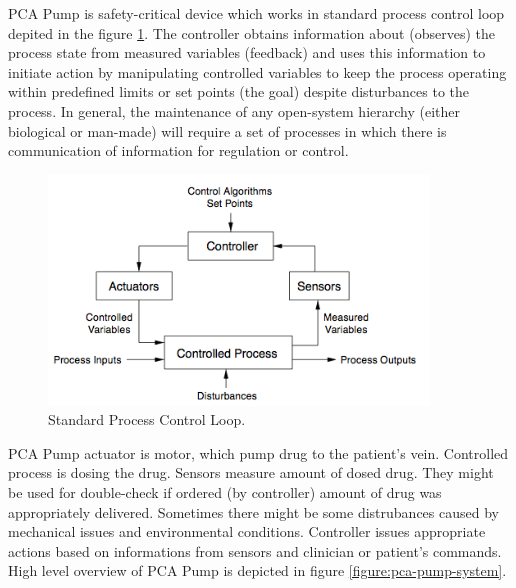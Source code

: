 PCA Pump is safety-critical device which works in standard process control loop depited in the figure \ref{figure:control-loop}. The controller obtains information about (observes) the process state from measured variables (feedback) and uses this information to initiate action by manipulating controlled variables to keep the process operating within predefined limits or set points (the goal) despite disturbances to the process. In general, the maintenance of any open-system hierarchy (either biological or man-made) will require a set of processes in which there is communication of information for regulation or control. \cite{SaferWorld} 

\begin{figure}[ht]%
    \begin{center}
    	\includegraphics[width=0.9\textwidth]{figures/safety-critical-loop.png}    	
    \end{center}
    \caption{Standard Process Control Loop.}
    \label{figure:control-loop}
\end{figure}

PCA Pump actuator is motor, which pump drug to the patient's vein. Controlled process is dosing the drug. Sensors measure amount of dosed drug. They might be used for double-check if ordered (by controller) amount of drug was appropriately delivered. Sometimes there might be some distrubances caused by mechanical issues and environmental conditions. Controller issues appropriate actions based on informations from sensors and clinician or patient's commands. High level overview of PCA Pump is depicted in figure \ref{figure:pca-pump-system}.

